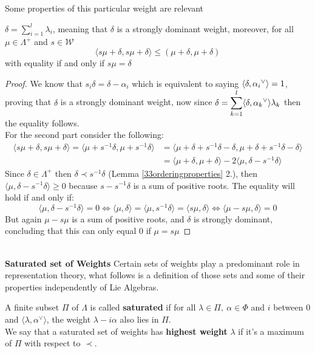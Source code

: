 Some properties of this particular weight are relevant 
\begin{lema}
	$\delta = \displaystyle \sum_{i=1}^l \lambda_i$, meaning that $\delta$ is a strongly dominant weight, moreover, for all $\mu \in \Lambda^+$ and $s \in \mathcal{W}$  $$\langle s\mu + \delta, s\mu+ \delta\rangle \le (\mu + \delta, \mu + \delta)$$ with equality if and only if $s\mu = \delta$ 	
\end{lema}
\begin{proof}
	We know that $s_i\delta=\delta-\alpha_i$ which is equivalent to saying $\langle {\delta},{\alpha_i}^\lor\rangle=1$, proving that $\delta$ is a strongly dominant weight, now since $\delta = \displaystyle\sum_{k=1}^l \langle {\delta},{\alpha_k}^\lor\rangle\lambda_k$ then the equality follows.\\
	For the second part consider the following:
	\begin{align*}
	\langle s\mu + \delta, s\mu + \delta \rangle  = \langle \mu + s^{-1}\delta, \mu + s^{-1}\delta \rangle &= \langle \mu+ \delta + s^{-1}\delta - \delta , \mu + \delta + s^{-1}\delta - \delta \rangle \\
	&=\langle \mu + \delta, \mu + \delta\rangle - 2\langle \mu,\delta-s^{-1}\delta\rangle
	\end{align*}
	Since $\delta \in \Lambda^+$ then $\delta \prec s^{-1}\delta$ (Lemma \ref{33orderingproperties} 2.), then $\langle \mu, \delta - s^{-1}\delta\rangle \ge 0$ because $s-s^{-1}\delta$ is a sum of positive roots. The equality will hold if and only if:
	$$\langle\mu,\delta-s^{-1}\delta\rangle = 0 \iff \langle \mu,\delta\rangle = \langle \mu, s^{-1}\delta\rangle = \langle s \mu, \delta \rangle \iff \langle \mu - s\mu,\delta \rangle = 0$$
	But again $\mu-s\mu$ is a sum of positive roots, and $\delta$ is strongly dominant, concluding that this can only equal $0$ if $\mu=s\mu$
\end{proof}\\
\textbf{Saturated set of Weights}
Certain sets of weights play a predominant role in representation theory, what follows is a definition of those sets and some of their properties independently of Lie Algebras.
\begin{defi}
	A finite subset $\Pi$ of $\Lambda$ is called \textbf{saturated} if for all $\lambda \in \Pi,\ \alpha \in \Phi$ and $i$ between $0$ and $\langle \lambda, \alpha^\lor\rangle $, the weight $\lambda - i\alpha$ also lies in $\Pi$.\\
	We say that a saturated set of weights has \textbf{highest weight} $\lambda$ if it's a maximum of $\Pi$ with respect to $\prec$.\\
\end{defi}
